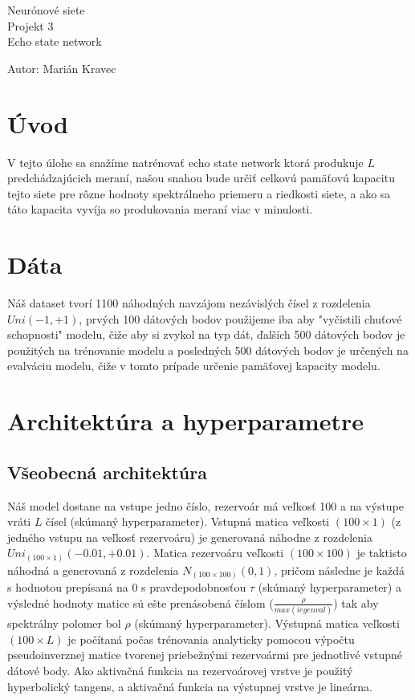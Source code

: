 \documentclass[a4paper]{article}
\begin{document}
 
	
	\pagestyle{plain}
	
	\begin{center}
		\sc\large
		Neurónové siete\\
		Projekt 3\\
		Echo state network
	\end{center}
	
	Autor: Marián Kravec
	\\
	
	\section{Úvod}
	
	V tejto úlohe sa snažíme natrénovať echo state network ktorá produkuje $L$ predchádzajúcich meraní, našou snahou bude určiť celkovú pamäťovú kapacitu tejto siete pre rôzne hodnoty spektrálneho priemeru a riedkosti siete, a ako sa táto kapacita vyvíja so produkovania meraní viac v minulosti.
	
	\section{Dáta}
	
	Náš dataset tvorí 1100 náhodných navzájom nezávislých čísel z rozdelenia $Uni(-1,+1)$, prvých 100 dátových bodov použijeme iba aby "vyčistili chuťové schopnosti" modelu, čiže aby si zvykol na typ dát, ďalších 500 dátových bodov je použitých na trénovanie modelu a posledných 500 dátových bodov je určených na evalváciu modelu, čiže v tomto prípade určenie pamäťovej kapacity modelu.
	
	\section{Architektúra a hyperparametre}
	
	\subsection*{Všeobecná architektúra}
	
	Náš model dostane na vstupe jedno číslo, rezervoár má veľkosť 100 a na výstupe vráti $L$ čísel (skúmaný hyperparameter). Vstupná matica veľkosti $(100\times1)$ (z jedného vstupu na veľkosť rezervoáru) je generovaná náhodne z rozdelenia $Uni_{(100\times1)}(-0.01, +0.01)$. Matica rezervoáru veľkosti $(100\times100)$ je taktisto náhodná a generovaná z rozdelenia $N_{(100\times100)}(0,1)$, pričom následne je každá s hodnotou prepísaná na $0$ s pravdepodobnosťou $\tau$ (skúmaný hyperparameter) a výsledné hodnoty matice sú ešte prenásobená číslom ($\frac{\rho}{max(iegenval)}$) tak aby spektrálny polomer bol $\rho$ (skúmaný hyperparameter). Výstupná matica veľkosti $(100\times L)$ je počítaná počas trénovania analyticky pomocou výpočtu pseudoinverznej matice tvorenej priebežnými rezervoármi pre jednotlivé vstupné dátové body. Ako aktivačná funkcia na rezervoárovej vrstve je použitý hyperbolický tangens, a aktivačná funkcia na výstupnej vrstve je lineárna.
	
\end{document}
